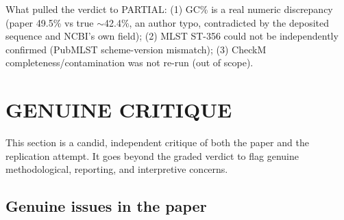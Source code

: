 \documentclass[11pt]{article}
\begin{document}
What pulled the verdict to PARTIAL: (1) GC\% is a real numeric discrepancy (paper 49.5\% vs true
$\sim$42.4\%, an author typo, contradicted by the deposited sequence and NCBI's own field);
(2) MLST ST-356 could not be independently confirmed (PubMLST scheme-version mismatch);
(3) CheckM completeness/contamination was not re-run (out of scope).

\section{GENUINE CRITIQUE}

This section is a candid, independent critique of both the paper and the replication attempt.
It goes beyond the graded verdict to flag genuine methodological, reporting, and interpretive
concerns.

\subsection{Genuine issues in the paper}
\end{document}
